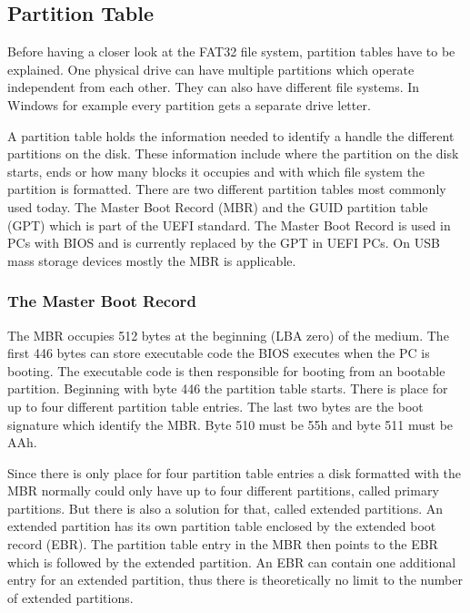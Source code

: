 \subsection{Partition Table}

Before having a closer look at the FAT32 file system, partition tables have to be explained. One physical drive can have multiple partitions which operate independent from each other. They can also have different file systems. In Windows for example every partition gets a separate drive letter.

A partition table holds the information needed to identify a handle the different partitions on the disk. These information include where the partition on the disk starts, ends or how many blocks it occupies and with which file system the partition is formatted. There are two different partition tables most commonly used today. The Master Boot Record (MBR) and the GUID partition table (GPT) which is part of the UEFI standard\cite{wiki_guid}. The Master Boot Record is used in PCs with BIOS and is currently replaced by the GPT in UEFI PCs. On USB mass storage devices mostly the MBR is applicable. 

\subsubsection{The Master Boot Record}

The MBR occupies 512 bytes at the beginning (LBA zero) of the medium. The first 446 bytes can store executable code the BIOS executes when the PC is booting. The executable code is then responsible for booting from an bootable partition. Beginning with byte 446 the partition table starts. There is place for up to four different partition table entries. The last two bytes are the boot signature which identify the MBR. Byte 510 must be 55h and byte 511 must be AAh\cite{fat_paul}.

Since there is only place for four partition table entries a disk formatted with the MBR normally could only have up to four different partitions, called primary partitions. But there is also a solution for that, called extended partitions. An extended partition has its own partition table enclosed by the extended boot record (EBR). The partition table entry in the MBR then points to the EBR which is followed by the extended partition. An EBR can contain one additional entry for an extended partition, thus there is theoretically no limit to the number of extended partitions\cite{usb_ms_jan}.

